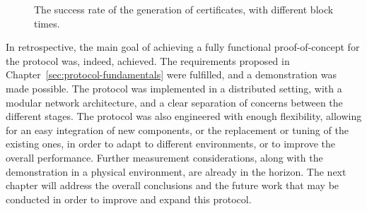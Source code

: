\begin{figure} [h!]
    \begin{center}
        \caption{The success rate of the generation of \pol{} certificates, with different block times.}
        \label{fig:block-time-success-rate}
    \end{center}
\end{figure}

In retrospective, the main goal of achieving a fully functional proof-of-concept for the \pol{} protocol was, indeed, achieved. The requirements proposed in Chapter~\ref{sec:protocol-fundamentals} were fulfilled, and a demonstration was made possible. The protocol was implemented in a distributed setting, with a modular network architecture, and a clear separation of concerns between the different stages. The protocol was also engineered with enough flexibility, allowing for an easy integration of new components, or the replacement or tuning of the existing ones, in order to adapt to different environments, or to improve the overall performance. Further measurement considerations, along with the demonstration in a physical environment, are already in the horizon. The next chapter will address the overall conclusions and the future work that may be conducted in order to improve and expand this \pol{} protocol.


    
